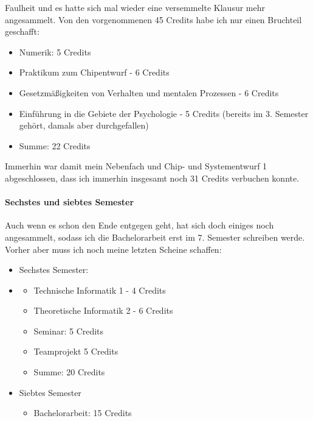 Faulheit und es hatte sich mal wieder eine versemmelte Klausur mehr angesammelt.
Von den vorgenommenen 45 Credits habe ich nur einen Bruchteil geschafft:
\begin{itemize}
\item Numerik: 5 Credits
\item Praktikum zum Chipentwurf - 6 Credits
\item Gesetzmäßigkeiten von Verhalten und mentalen Prozessen - 6
  Credits
\item Einführung in die Gebiete der Psychologie - 5 Credits (bereits
  im 3. Semester gehört, damals aber durchgefallen)
\item Summe: 22 Credits 
\end{itemize}
Immerhin war damit mein Nebenfach und Chip- und Systementwurf 1
abgeschlossen, dass ich immerhin insgesamt noch 31 Credits verbuchen
konnte.
\paragraph{Sechstes und siebtes Semester}
Auch wenn es schon den Ende entgegen geht, hat sich doch einiges noch
angesammelt, sodass ich die Bachelorarbeit erst im 7. Semester
schreiben werde. Vorher aber muss
ich noch meine letzten Scheine schaffen:
\begin{itemize}
\item Sechstes Semester:
\item
  \begin{itemize}
  \item Technische Informatik 1 - 4 Credits
  \item Theoretische Informatik 2 - 6 Credits
  \item Seminar: 5 Credits
  \item Teamprojekt 5 Credits
  \item Summe: 20 Credits
  \end{itemize}
\item Siebtes Semester
  \begin{itemize}
  \item Bachelorarbeit: 15 Credits
  \end{itemize}
\end{itemize}

